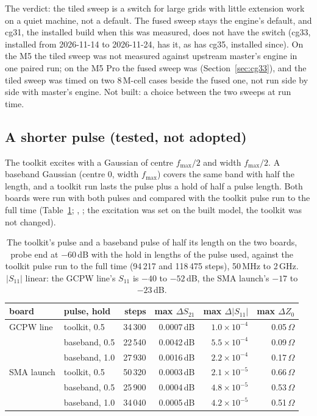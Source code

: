 The verdict: the tiled sweep is a switch for large grids with little extension work on a quiet machine, not a
default. The fused sweep stays the engine's default, and cg31, the installed build when this was measured, does not have the switch (cg33, installed from 2026-11-14 to 2026-11-24, has it, as has cg35, installed since). On the M5 the tiled
sweep was not measured against upstream master's  engine in one paired run; on the M5 Pro the fused sweep was
(Section~\ref{sec:cg33}), and the tiled sweep was timed on two 8\,M-cell cases beside the fused one, not run side by
side with master's engine. Not built: a choice between the two sweeps at run time.

\subsection{A shorter pulse (tested, not adopted)}\label{sec:pulse}
The toolkit excites with a Gaussian of centre $f_{\max}/2$ and width $f_{\max}/2$. A baseband Gaussian (centre 0,
width $f_{\max}$) covers the same band with half the length, and a toolkit run lasts the pulse plus a hold of half a
pulse length. Both boards were run with both pulses and compared with the toolkit pulse run to the full time
(Table~\ref{tab:pulse}; , ; the excitation was set on
the built model, the toolkit was not changed).

\begin{table}[H]\centering\small
\begin{tabular}{@{}llrrrr@{}}
\toprule
board & pulse, hold & steps & max $\Delta S_{21}$ & max $\Delta|S_{11}|$ & max $\Delta Z_0$ \\
\midrule
GCPW line & toolkit, 0.5 & 34\,300 & 0.0007\,dB & $1.0\times10^{-4}$ & 0.05\,$\Omega$ \\
 & baseband, 0.5 & 22\,540 & 0.0042\,dB & $5.5\times10^{-4}$ & 0.09\,$\Omega$ \\
 & baseband, 1.0 & 27\,930 & 0.0016\,dB & $2.2\times10^{-4}$ & 0.17\,$\Omega$ \\
SMA launch & toolkit, 0.5 & 50\,320 & 0.0003\,dB & $2.1\times10^{-5}$ & 0.66\,$\Omega$ \\
 & baseband, 0.5 & 25\,900 & 0.0004\,dB & $4.8\times10^{-5}$ & 0.53\,$\Omega$ \\
 & baseband, 1.0 & 34\,040 & 0.0005\,dB & $4.2\times10^{-5}$ & 0.51\,$\Omega$ \\
\bottomrule
\end{tabular}
\caption{The toolkit's pulse and a baseband pulse of half its length on the two boards, probe end at $-60$\,dB with
the hold in lengths of the pulse used, against the toolkit pulse run to the full time (94\,217 and 118\,475 steps),
50\,MHz to 2\,GHz. $|S_{11}|$ linear: the GCPW line's $S_{11}$ is $-40$ to $-52$\,dB, the SMA launch's $-17$ to
$-23$\,dB.}\label{tab:pulse}
\end{table}

